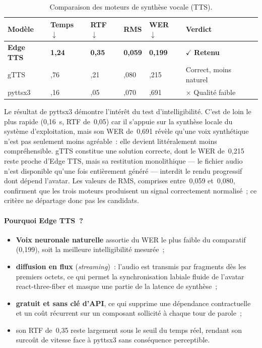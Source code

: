 \begin{table}[H]
  \centering
  \footnotesize
  \renewcommand{\arraystretch}{1.3}
  \setlength{\tabcolsep}{5pt}
  \begin{tabularx}{\textwidth}{|>{\raggedright\arraybackslash}p{2.1cm}|>{\centering\arraybackslash}p{1.5cm}|>{\centering\arraybackslash}p{1.3cm}|>{\centering\arraybackslash}p{1.5cm}|>{\centering\arraybackslash}p{1.5cm}|>{\raggedright\arraybackslash}X|}
    \hline
    \rowcolor{blue!10}
    \textbf{Modèle} & \textbf{Temps} $\downarrow$ & \textbf{RTF} $\downarrow$ & \textbf{RMS} & \textbf{WER} $\downarrow$ & \textbf{Verdict} \\
    \hline
    \rowcolor{green!8}
    \textbf{Edge TTS} & \textbf{1,24} & \textbf{0,35} & \textbf{0,059} & \textbf{0,199} & $\checkmark$ \textbf{Retenu} \\ \hline
    gTTS & 0,76 & 0,21 & 0,080 & 0,215 & Correct, moins naturel \\ \hline
    pyttsx3 & 0,16 & 0,05 & 0,070 & 0,691 & $\times$ Qualité faible \\ \hline
  \end{tabularx}
  \caption{Comparaison des moteurs de synthèse vocale (TTS).}
  \label{tab:bench-tts}
\end{table}

Le résultat de pyttsx3 démontre l'intérêt du test d'intelligibilité. C'est de loin le plus rapide
(0,16~s, RTF de~0,05) car il s'appuie sur la synthèse locale du système d'exploitation, mais son
WER de~0,691 révèle qu'une voix synthétique n'est pas seulement moins agréable~: elle devient
littéralement moins compréhensible. gTTS constitue une solution correcte, dont le WER de~0,215
reste proche d'Edge TTS, mais sa restitution monolithique --- le fichier audio n'est disponible
qu'une fois entièrement généré --- interdit le rendu progressif dont dépend l'avatar. Les valeurs
de RMS, comprises entre~0,059 et~0,080, confirment que les trois moteurs produisent un signal
correctement normalisé~; ce critère ne départage donc pas les candidats.

\paragraph{Pourquoi Edge TTS~?}
\begin{itemize}
  \item \textbf{Voix neuronale naturelle} assortie du WER le plus faible du comparatif (0,199), soit la meilleure intelligibilité mesurée~;
  \item \textbf{diffusion en flux} (\textit{streaming})~: l'audio est transmis par fragments dès les premiers octets, ce qui permet la synchronisation labiale fluide de l'avatar react-three-fiber et masque une partie de la latence de synthèse~;
  \item \textbf{gratuit et sans clé d'API}, ce qui supprime une dépendance contractuelle et un coût récurrent sur un composant sollicité à chaque tour de parole~;
  \item son RTF de~0,35 reste largement sous le seuil du temps réel, rendant son surcoût de vitesse face à pyttsx3 sans conséquence perceptible.
\end{itemize}


